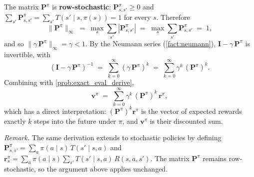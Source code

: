 \documentclass[11pt]{article}
\begin{document}
\begin{solution}
The matrix $\mathbf{P}^\pi$ is \textbf{row-stochastic}: $\mathbf{P}^\pi_{s,s'} \ge 0$ and $\sum_{s'} \mathbf{P}^\pi_{s,s'} = \sum_{s'} T(s' \mid s, \pi(s)) = 1$ for every $s$. Therefore
$$
\|\mathbf{P}^\pi\|_\infty \;=\; \max_s \sum_{s'} |\mathbf{P}^\pi_{s,s'}| \;=\; \max_s \sum_{s'} \mathbf{P}^\pi_{s,s'} \;=\; 1,
$$
and so $\|\gamma\, \mathbf{P}^\pi\|_\infty = \gamma < 1$. By the Neumann series (\cref{fact:neumann}), $\mathbf{I} - \gamma\, \mathbf{P}^\pi$ is invertible, with
$$
(\mathbf{I} - \gamma\, \mathbf{P}^\pi)^{-1} \;=\; \sum_{k=0}^{\infty} (\gamma\, \mathbf{P}^\pi)^k \;=\; \sum_{k=0}^{\infty} \gamma^k\, (\mathbf{P}^\pi)^k.
$$
Combining with \cref{prob:exact_eval_derive},
$$
\mathbf{v}^\pi \;=\; \sum_{k=0}^{\infty} \gamma^k\, (\mathbf{P}^\pi)^k\, \mathbf{r}^\pi,
$$
which has a direct interpretation: $(\mathbf{P}^\pi)^k \mathbf{r}^\pi$ is the vector of expected rewards exactly $k$ steps into the future under $\pi$, and $\mathbf{v}^\pi$ is their discounted sum.
\end{solution}

\emph{Remark.} The same derivation extends to stochastic policies by defining $\mathbf{P}^\pi_{s,s'} = \sum_{a} \pi(a \mid s)\, T(s' \mid s, a)$ and $\mathbf{r}^\pi_s = \sum_{a} \pi(a \mid s) \sum_{s'} T(s' \mid s, a)\, R(s, a, s')$. The matrix $\mathbf{P}^\pi$ remains row-stochastic, so the argument above applies unchanged.





\end{document}

